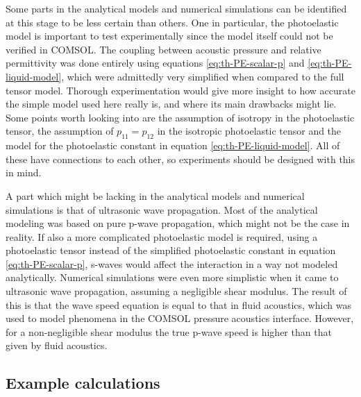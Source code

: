 \documentclass[11pt,twoside]{eitExjobb}
\begin{document}
	Some parts in the analytical models and numerical simulations can be identified at this stage to be less certain than others. One in particular, the photoelastic model is important to test experimentally since the model itself could not be verified in COMSOL. The coupling between acoustic pressure and relative permittivity was done entirely using equations \eqref{eq:th-PE-scalar-p} and \eqref{eq:th-PE-liquid-model}, which were admittedly very simplified when compared to the full tensor model. Thorough experimentation would give more insight to how accurate the simple model used here really is, and where its main drawbacks might lie. Some points worth looking into are the assumption of isotropy in the photoelastic tensor, the assumption of $p_{11} = p_{12}$ in the isotropic photoelastic tensor and the model for the photoelastic constant in equation \eqref{eq:th-PE-liquid-model}. All of these have connections to each other, so experiments should be designed with this in mind.
	
	A part which might be lacking in the analytical models and numerical simulations is that of ultrasonic wave propagation. Most of the analytical modeling was based on pure p-wave propagation, which might not be the case in reality. If also a more complicated photoelastic model is required, using a photoelastic tensor instead of the simplified photoelastic constant in equation \eqref{eq:th-PE-scalar-p}, s-waves would affect the interaction in a way not modeled analytically. Numerical simulations were even more simplistic when it came to ultrasonic wave propagation, assuming a negligible shear modulus. The result of this is that the wave speed equation is equal to that in fluid acoustics, which was used to model phenomena in the COMSOL pressure acoustics interface. However, for a non-negligible shear modulus the true p-wave speed is higher than that given by fluid acoustics. 
	
	\subsection{Example calculations}
	
\end{document}
